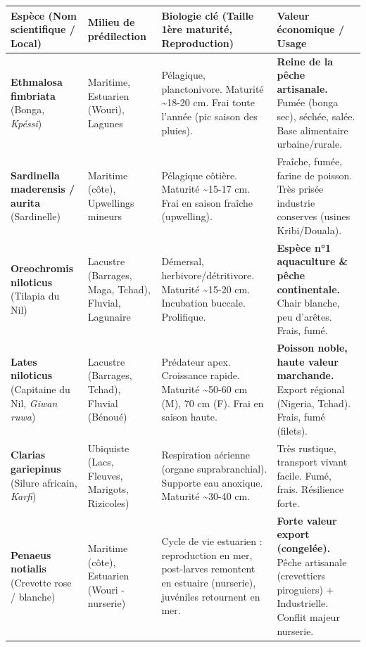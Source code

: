 \documentclass[11pt]{article}
\begin{document}
\begin{center}
\begin{tabularx}{\linewidth}{|l|l|X|X|}\hline
\rowcolor{popblueL}
\textbf{Espèce (Nom scientifique / Local)} & \textbf{Milieu de prédilection} & \textbf{Biologie clé (Taille 1ère maturité, Reproduction)} & \textbf{Valeur économique / Usage} \\ \hline
\textbf{Ethmalosa fimbriata} (Bonga, \emph{Kpéssi}) & Maritime, Estuarien (Wouri), Lagunes & Pélagique, planctonivore. Maturité \textasciitilde 18-20 cm. Frai toute l'année (pic saison des pluies). & \textbf{Reine de la pêche artisanale.} Fumée (bonga sec), séchée, salée. Base alimentaire urbaine/rurale. \\ \hline
\textbf{Sardinella maderensis / aurita} (Sardinelle) & Maritime (côte), Upwellings mineurs & Pélagique côtière. Maturité \textasciitilde 15-17 cm. Frai en saison fraîche (upwelling). & Fraîche, fumée, farine de poisson. Très prisée industrie conserves (usines Kribi/Douala). \\ \hline
\textbf{Oreochromis niloticus} (Tilapia du Nil) & Lacustre (Barrages, Maga, Tchad), Fluvial, Lagunaire & Démersal, herbivore/détritivore. Maturité \textasciitilde 15-20 cm. Incubation buccale. Prolifique. & \textbf{Espèce n°1 aquaculture \& pêche continentale.} Chair blanche, peu d'arêtes. Frais, fumé. \\ \hline
\textbf{Lates niloticus} (Capitaine du Nil, \emph{Giwan ruwa}) & Lacustre (Barrages, Tchad), Fluvial (Bénoué) & Prédateur apex. Croissance rapide. Maturité \textasciitilde 50-60 cm (M), 70 cm (F). Frai en saison haute. & \textbf{Poisson noble, haute valeur marchande.} Export régional (Nigeria, Tchad). Frais, fumé (filets). \\ \hline
\textbf{Clarias gariepinus} (Silure africain, \emph{Karfi}) & Ubiquiste (Lacs, Fleuves, Marigots, Rizicoles) & Respiration aérienne (organe suprabranchial). Supporte eau anoxique. Maturité \textasciitilde 30-40 cm. & Très rustique, transport vivant facile. Fumé, frais. Résilience forte. \\ \hline
\textbf{Penaeus notialis} (Crevette rose / blanche) & Maritime (côte), Estuarien (Wouri - nurserie) & Cycle de vie estuarien : reproduction en mer, post-larves remontent en estuaire (nurserie), juvéniles retournent en mer. & \textbf{Forte valeur export (congelée).} Pêche artisanale (crevettiers piroguiers) + Industrielle. Conflit majeur nurserie. \\ \hline
\end{tabularx}
\end{center}
\end{document}
